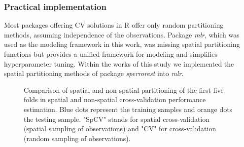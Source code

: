 \documentclass[review]{elsarticle}
\begin{document}
\subsubsection{Practical implementation}
Most packages offering \ac{CV} solutions in R offer only random partitioning methods, assuming independence of the observations.
Package \textit{mlr}, which was used as the modeling framework in this work, was missing spatial partitioning functions but provides a unified framework for modeling and simplifies hyperparameter tuning.
Within the works of this study we implemented the spatial partitioning methods of package \textit{sperrorest} into \textit{mlr}.

\begin{figure} [t!]
	\begin{center}
		\caption[]{Comparison of spatial and non-spatial partitioning of the first five folds in spatial and non-spatial cross-validation performance estimation.
			Blue dots represent the training samples and orange dots the testing sample.
			"SpCV" stands for spatial cross-validation (spatial sampling of observations) and "CV" for cross-validation (random sampling of observations).}
		\label{fig:cv_settings_comparison}
	\end{center}
\end{figure}
\end{document}
